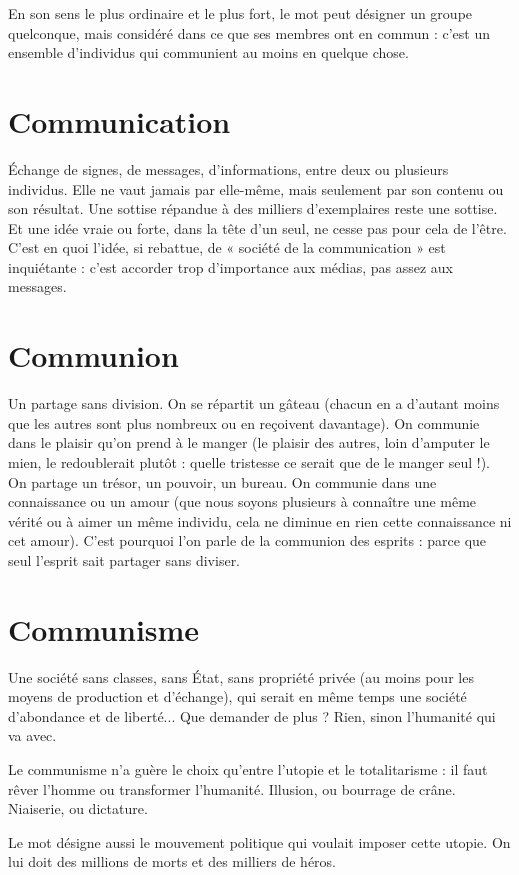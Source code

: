 En son sens le plus ordinaire et le plus fort, le mot peut désigner un groupe
quelconque, mais considéré dans ce que ses membres ont en commun : c’est un
ensemble d’individus qui communient au moins en quelque chose.

\section{Communication}
Échange de signes, de messages, d'informations, entre
deux ou plusieurs individus. Elle ne vaut jamais par
elle-même, mais seulement par son contenu ou son résultat. Une sottise
répandue à des milliers d'exemplaires reste une sottise. Et une idée vraie ou
forte, dans la tête d’un seul, ne cesse pas pour cela de l’être. C’est en quoi l’idée,
si rebattue, de « société de la communication » est inquiétante : c’est accorder
trop d’importance aux médias, pas assez aux messages.

\section{Communion}
Un partage sans division. On se répartit un gâteau (chacun
en a d’autant moins que les autres sont plus nombreux ou
en reçoivent davantage). On communie dans le plaisir qu’on prend à le
manger (le plaisir des autres, loin d’amputer le mien, le redoublerait plutôt :
quelle tristesse ce serait que de le manger seul !). On partage un trésor, un
pouvoir, un bureau. On communie dans une connaissance ou un amour (que
nous soyons plusieurs à connaître une même vérité ou à aimer un même individu,
cela ne diminue en rien cette connaissance ni cet amour). C’est pourquoi
l’on parle de la communion des esprits : parce que seul l'esprit sait
partager sans diviser.

\section{Communisme}
Une société sans classes, sans État, sans propriété privée
(au moins pour les moyens de production et d'échange),
qui serait en même temps une société d’abondance et de liberté... Que
demander de plus ? Rien, sinon l’humanité qui va avec.

Le communisme n’a guère le choix qu’entre l’utopie et le totalitarisme : il
faut rêver l’homme ou transformer l'humanité. Illusion, ou bourrage de crâne.
Niaiserie, ou dictature.

Le mot désigne aussi le mouvement politique qui voulait imposer cette
utopie. On lui doit des millions de morts et des milliers de héros.

